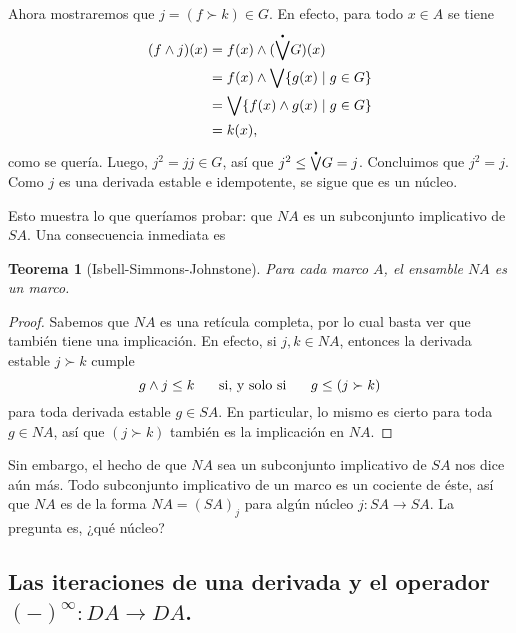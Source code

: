 \documentclass[12pt,letterpaper,titlepage]{article}
\newtheorem*{thm}{Teorema}
\theoremstyle{definition}
\newcommand\Sup{\bigvee}
\renewcommand\inf{\wedge}
\newcommand\pSup{%
    {\stackrel{\raisebox{-3pt}{\scalebox{0.5}{$\bullet$}}}{\bigvee}}
  }%
\newcommand\ssi{\hspace{5mm}\text{ si, y solo si }\hspace{5mm}}
\newcommand\tps[1]{\texorpdfstring{#1}{}}
\newcommand\<{\langle}
\renewcommand\>{\rangle}
\begin{document}
Ahora mostraremos que $j=(f\succ k)\in G$.
En efecto, para todo $x\in A$ se tiene
\begin{align*}
  (f\inf j)(x)
  &= f(x) \inf (\pSup G)(x) \\
  &= f(x) \inf \Sup\{g(x) \mid g\in G\} \\
  &= \Sup\{f(x) \inf g(x) \mid g\in G\} \\
  &= k(x),
\end{align*}
como se quería.
Luego, $j^2=jj\in G$, así que $j^2\leq\pSup G = j$.
Concluimos que $j^2=j$.
Como $j$ es una derivada estable e idempotente,
se sigue que es un núcleo.

Esto muestra lo que queríamos probar: que $NA$ es un subconjunto
implicativo de $SA$.
Una consecuencia inmediata es

\begin{thm}[Isbell-Simmons-Johnstone]
  Para cada marco $A$, el ensamble $NA$ es un marco.
\end{thm}
\begin{proof}
  Sabemos que $NA$ es una retícula completa, por lo cual
  basta ver que también tiene una implicación.
  En efecto, si $j,k\in NA$, entonces la derivada estable
  $j\succ k$ cumple
  \[
    g\inf j\leq k
    \ssi
    g\leq (j\succ k)
  \]
  para toda derivada estable $g\in SA$.
  En particular, lo mismo es cierto para toda $g\in NA$, así que
  $(j\succ k)$ también es la implicación en $NA$.
\end{proof}
Sin embargo, el hecho de que $NA$ sea un subconjunto
implicativo de $SA$ nos dice aún más.
Todo subconjunto implicativo de un marco es un cociente de éste,
así que $NA$ es de la forma $NA=(SA)_j$ para algún núcleo
$j:SA\to SA$.
La pregunta es, ¿qué núcleo?

\subsection{Las iteraciones de una derivada y el operador \tps{$(-)^\infty:DA\to DA$}.}
\end{document}
